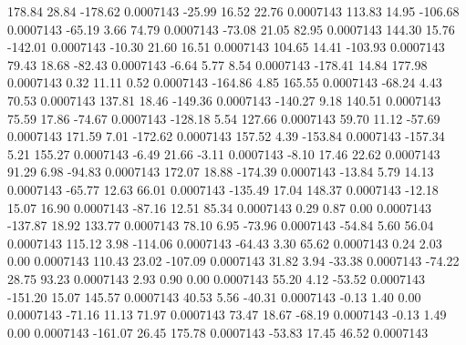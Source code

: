       178.84       28.84     -178.62     0.0007143
      -25.99       16.52       22.76     0.0007143
      113.83       14.95     -106.68     0.0007143
      -65.19        3.66       74.79     0.0007143
      -73.08       21.05       82.95     0.0007143
      144.30       15.76     -142.01     0.0007143
      -10.30       21.60       16.51     0.0007143
      104.65       14.41     -103.93     0.0007143
       79.43       18.68      -82.43     0.0007143
       -6.64        5.77        8.54     0.0007143
     -178.41       14.84      177.98     0.0007143
        0.32       11.11        0.52     0.0007143
     -164.86        4.85      165.55     0.0007143
      -68.24        4.43       70.53     0.0007143
      137.81       18.46     -149.36     0.0007143
     -140.27        9.18      140.51     0.0007143
       75.59       17.86      -74.67     0.0007143
     -128.18        5.54      127.66     0.0007143
       59.70       11.12      -57.69     0.0007143
      171.59        7.01     -172.62     0.0007143
      157.52        4.39     -153.84     0.0007143
     -157.34        5.21      155.27     0.0007143
       -6.49       21.66       -3.11     0.0007143
       -8.10       17.46       22.62     0.0007143
       91.29        6.98      -94.83     0.0007143
      172.07       18.88     -174.39     0.0007143
      -13.84        5.79       14.13     0.0007143
      -65.77       12.63       66.01     0.0007143
     -135.49       17.04      148.37     0.0007143
      -12.18       15.07       16.90     0.0007143
      -87.16       12.51       85.34     0.0007143
        0.29        0.87        0.00     0.0007143
     -137.87       18.92      133.77     0.0007143
       78.10        6.95      -73.96     0.0007143
      -54.84        5.60       56.04     0.0007143
      115.12        3.98     -114.06     0.0007143
      -64.43        3.30       65.62     0.0007143
        0.24        2.03        0.00     0.0007143
      110.43       23.02     -107.09     0.0007143
       31.82        3.94      -33.38     0.0007143
      -74.22       28.75       93.23     0.0007143
        2.93        0.90        0.00     0.0007143
       55.20        4.12      -53.52     0.0007143
     -151.20       15.07      145.57     0.0007143
       40.53        5.56      -40.31     0.0007143
       -0.13        1.40        0.00     0.0007143
      -71.16       11.13       71.97     0.0007143
       73.47       18.67      -68.19     0.0007143
       -0.13        1.49        0.00     0.0007143
     -161.07       26.45      175.78     0.0007143
      -53.83       17.45       46.52     0.0007143
